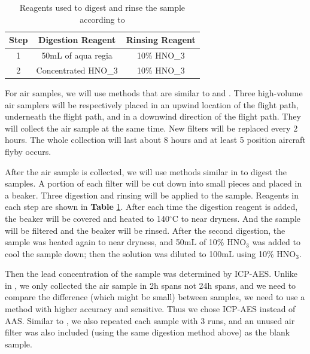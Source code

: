 \documentclass[12pt]{article}
\begin{document}
\begin{table}
    \centering
    \begin{tabular}[0.3\textwidth]{|c|c|c|}
    \hline
    Step & Digestion Reagent & Rinsing Reagent \\ \hline
    1 & 50mL of aqua regia & 10\% HNO_{3} \\ \hline
    2 & Concentrated HNO_{3} & 10\% HNO_{3} \\ \hline 
    \end{tabular}
    \caption{\small{Reagents used to digest and rinse the sample according to \cite{gharaibeh_determination_2010}}}
    \label{tab:steps}
    \vspace{0.2cm}
\end{table}

For air samples, we will use methods that are similar to \cite{gharaibeh_determination_2010} and \cite{vijayanand_assessment_2008}. Three high-volume air samplers will be respectively placed in an upwind location of the flight path, underneath the flight path, and in a downwind direction of the flight path. They will collect the air sample at the same time. New filters will be replaced every 2 hours. The whole collection will last about 8 hours and at least 5 position aircraft flyby occurs. 


After the air sample is collected, we will use methods similar in \cite{gharaibeh_determination_2010} to digest the samples. A portion of each filter will be cut down into small pieces and placed in a beaker. Three digestion and rinsing will be applied to the sample. Reagents in each step are shown in \textbf{Table} \ref{tab:steps}. After each time the digestion reagent is added, the beaker will be covered and heated to 140$^{\circ}$C to near dryness. And the sample will be filtered and the beaker will be rinsed. After the second digestion, the sample was heated again to near dryness, and 50mL of 10\% HNO$_{3}$ was added to cool the sample down; then the solution was diluted to 100mL using 10\% HNO$_{3}$. \cite{gharaibeh_determination_2010}


Then the lead concentration of the sample was determined by ICP-AES. Unlike in \cite{gharaibeh_determination_2010}, we only collected the air sample in 2h spans not 24h spans, and we need to compare the difference (which might be small) between samples, we need to use a method with higher accuracy and sensitive. Thus we chose ICP-AES instead of AAS. Similar to \cite{gharaibeh_determination_2010}, we also repeated each sample with 3 runs, and an unused air filter was also included (using the same digestion method above) as the blank sample. 
\end{document}
